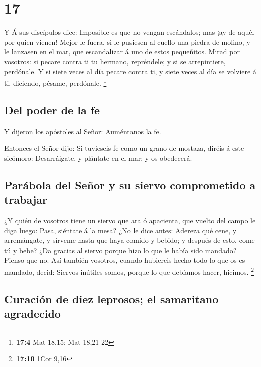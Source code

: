 \hypertarget{section-16}{%
\section{17}\label{section-16}}

 Y Á sus discípulos dice: Imposible es que no vengan
escándalos; mas ¡ay de aquél por quien vienen!  Mejor le
fuera, si le pusiesen al cuello una piedra de molino, y le lanzasen en
el mar, que escandalizar á uno de estos pequeñitos.  Mirad
por vosotros: si pecare contra ti tu hermano, repréndele; y si se
arrepintiere, perdónale.  Y si siete veces al día pecare
contra ti, y siete veces al día se volviere á ti, diciendo, pésame,
perdónale. \footnote{\textbf{17:4} Mat 18,15; Mat 18,21-22}

\hypertarget{del-poder-de-la-fe}{%
\subsection{Del poder de la fe}\label{del-poder-de-la-fe}}

 Y dijeron los apóstoles al Señor: Auméntanos la fe.

 Entonces el Señor dijo: Si tuvieseis fe como un grano de
mostaza, diréis á este sicómoro: Desarráigate, y plántate en el mar; y
os obedecerá.

\hypertarget{paruxe1bola-del-seuxf1or-y-su-siervo-comprometido-a-trabajar}{%
\subsection{Parábola del Señor y su siervo comprometido a
trabajar}\label{paruxe1bola-del-seuxf1or-y-su-siervo-comprometido-a-trabajar}}

 ¿Y quién de vosotros tiene un siervo que ara ó apacienta,
que vuelto del campo le diga luego: Pasa, siéntate á la mesa?
 ¿No le dice antes: Adereza qué cene, y arremángate, y
sírveme hasta que haya comido y bebido; y después de esto, come tú y
bebe?  ¿Da gracias al siervo porque hizo lo que le había
sido mandado? Pienso que no.  Así también vosotros,
cuando hubiereis hecho todo lo que os es mandado, decid: Siervos
inútiles somos, porque lo que debíamos hacer, hicimos. \footnote{\textbf{17:10}
  1Cor 9,16}

\hypertarget{curaciuxf3n-de-diez-leprosos-el-samaritano-agradecido}{%
\subsection{Curación de diez leprosos; el samaritano
agradecido}\label{curaciuxf3n-de-diez-leprosos-el-samaritano-agradecido}}

